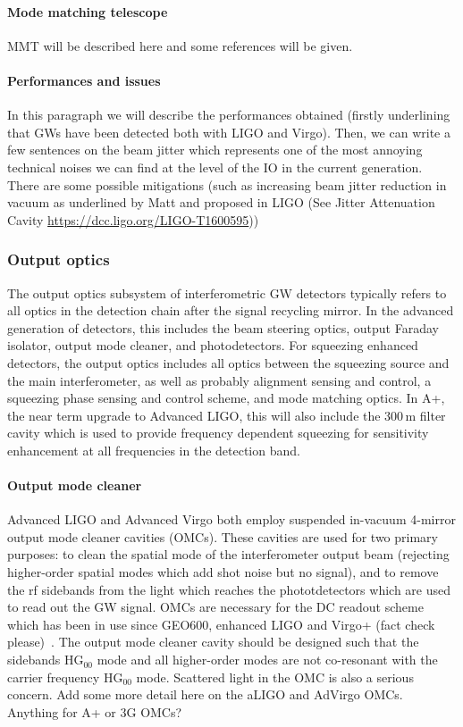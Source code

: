 \paragraph{Mode matching telescope}
MMT will be described here and some references will be given.

\paragraph {Performances and issues}
In this paragraph we will describe the performances obtained (firstly underlining that GWs have been detected both with LIGO and Virgo). Then, we can write a few sentences on the beam jitter which represents one of the most annoying technical noises we can find at the level of the IO in the current generation. There are some possible mitigations (such as increasing beam jitter reduction in vacuum as underlined by Matt and proposed in LIGO (See Jitter Attenuation Cavity \url{https://dcc.ligo.org/LIGO-T1600595}))

\subsubsection{Output optics}
The output optics subsystem of interferometric GW detectors typically refers to all optics in the detection chain after the signal recycling mirror. In the advanced generation of detectors, this includes the beam steering optics, output Faraday isolator, output mode cleaner, and photodetectors. For squeezing enhanced detectors, the output optics includes all optics between the squeezing source and the main interferometer, as well as probably alignment sensing and control, a squeezing phase sensing and control scheme, and mode matching optics.
In A+, the near term upgrade to Advanced LIGO, this will also include the 300\,m filter cavity which is used to provide frequency dependent squeezing for sensitivity enhancement at all frequencies in the detection band. 

\paragraph {Output mode cleaner}
Advanced LIGO and Advanced Virgo both employ suspended in-vacuum 4-mirror output mode cleaner cavities (OMCs). 
These cavities are used for two primary purposes: to clean the spatial mode of the interferometer output beam (rejecting higher-order spatial modes which add shot noise but no signal), and to remove the rf sidebands from the light which reaches the phototdetectors which are used to read out the GW signal. OMCs are necessary for the DC readout scheme which has been in use since GEO600, enhanced LIGO and Virgo+ (fact check please)~\cite{dcreadout}. 
The output mode cleaner cavity should be designed such that the sidebands HG$_{00}$ mode and all higher-order modes are not co-resonant with the carrier frequency HG$_{00}$ mode. Scattered light in the OMC is also a serious concern. 
Add some more detail here on the aLIGO and AdVirgo OMCs. Anything for A+ or 3G OMCs?

